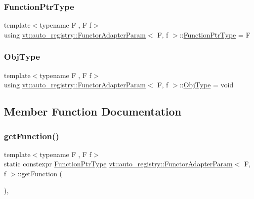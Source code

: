\subsubsection{\texorpdfstring{Function\+Ptr\+Type}{FunctionPtrType}}
{\footnotesize\ttfamily template$<$typename F , F f$>$ \\
using \hyperlink{structvt_1_1auto__registry_1_1_functor_adapter_param}{vt\+::auto\+\_\+registry\+::\+Functor\+Adapter\+Param}$<$ F, f $>$\+::\hyperlink{structvt_1_1auto__registry_1_1_functor_adapter_param_a67360700f61d3d116cee4619754630be}{Function\+Ptr\+Type} =  F}

\mbox{\label{structvt_1_1auto__registry_1_1_functor_adapter_param_ad431c9fd02eed8bb89fed91e86730de7}} 
\subsubsection{\texorpdfstring{Obj\+Type}{ObjType}}
{\footnotesize\ttfamily template$<$typename F , F f$>$ \\
using \hyperlink{structvt_1_1auto__registry_1_1_functor_adapter_param}{vt\+::auto\+\_\+registry\+::\+Functor\+Adapter\+Param}$<$ F, f $>$\+::\hyperlink{structvt_1_1auto__registry_1_1_functor_adapter_param_ad431c9fd02eed8bb89fed91e86730de7}{Obj\+Type} =  void}



\subsection{Member Function Documentation}
\mbox{\label{structvt_1_1auto__registry_1_1_functor_adapter_param_acd2d07590c0dfa22e86e331260160dde}} 
\subsubsection{\texorpdfstring{get\+Function()}{getFunction()}}
{\footnotesize\ttfamily template$<$typename F , F f$>$ \\
static constexpr \hyperlink{structvt_1_1auto__registry_1_1_functor_adapter_param_a67360700f61d3d116cee4619754630be}{Function\+Ptr\+Type} \hyperlink{structvt_1_1auto__registry_1_1_functor_adapter_param}{vt\+::auto\+\_\+registry\+::\+Functor\+Adapter\+Param}$<$ F, f $>$\+::get\+Function (\begin{DoxyParamCaption}{ }\end{DoxyParamCaption})\hspace{0.3cm}{\ttfamily [inline]}, {\ttfamily [static]}}

